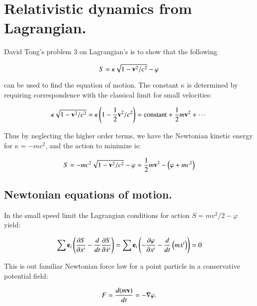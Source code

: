 \documentclass{article}      %
\title{} %
\author{Peeter Joot}         %
\newcommand{\grad}[0]{\nabla}
\newcommand{\PD}[2]{ \frac{\partial{#1}}{\partial {#2}} }
\begin{document}

\maketitle{}

\section{ Relativistic dynamics from Lagrangian. }

David Tong's problem 3 on Lagrangian's is to show that the following

\begin{equation}
S = \kappa \sqrt{1 - \mathbf{v}^2/c^2} - \varphi
\end{equation}

can be used to find the equation of motion.  The constant $\kappa$ is determined
by requiring correspondence with the classical limit for small velocities:

\begin{equation*}
\kappa \sqrt{1 - \mathbf{v}^2/c^2} \simeq \kappa \left( 1 - \frac{1}{2} \mathbf{v}^2/c^2 \right) = \text{constant} + \frac{1}{2} m \mathbf{v}^2 + \cdots
\end{equation*}

Thus by neglecting the higher order terms, we have the Newtonian kinetic energy for $\kappa = -mc^2$, and the action to minimize is:

\begin{equation}
S = -m c^2\sqrt{1 - \mathbf{v}^2/c^2} - \varphi \simeq \frac{1}{2}m \mathbf{v}^2 - \left(\varphi + m c^2\right)
\end{equation}

\subsection{ Newtonian equations of motion. }
In the small speed limit the Lagrangian conditions for action $S = mv^2/2 - \varphi$ yield:

\begin{equation*}
\sum \Be_i \left(\PD{S}{x^i} - \frac{d}{dt}\PD{S}{\dot{x}^i}\right) = \sum \Be_i \left(-\PD{\varphi}{x^i} - \frac{d}{dt}\left(m \dot{x}^i\right)\right) = 0
\end{equation*}

This is out familiar Newtonian force law for a point particle in a conservative potential field:

\begin{equation}
F = \frac{d (m \Bv)}{dt} = -\grad \varphi.
\end{equation}
\end{document}
